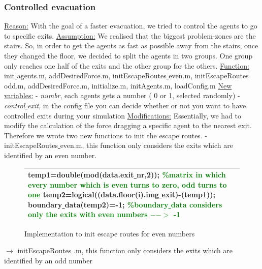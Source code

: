 \documentclass[11pt]{article}
\begin{document}
\subsubsection{Controlled evacuation}

\underline{Reason:}
\newline
With the goal of a faster evacuation, we tried to control the agents to go to specific exits. 
\newline
\underline{Assumption:}
\newline
We realised that the biggest problem-zones are the stairs. So, in order to get the agents as fast as possible away from the stairs, once they changed the floor, we decided to split the agents in two groups. 
One group only reaches one half of the exits and the other group for the others. 
\newline
\underline{Function:}
\newline
init\underline{ }agents.m, addDesiredForce.m, initEscapeRoutes\underline{ }even.m, initEscapeRoutes\underline{ }odd.m, addDesiredForce.m, initialize.m, initAgents.m, loadConfig.m
\newline
\underline{New variables:}
\newline 
- \textit{numbr}, each agents gets a number ( 0 or 1, selected randomly)
\newline
- \textit{control\underline{ }exit}, in the config file you can decide whether or not you want to have controlled exits during your simulation
\newline
\underline{Modifications:}
\newline
Essentially, we had to modify the calculation of the force dragging a specific agent to the nearest exit.  Therefore we wrote two new functions to init the escape routes. 
\newline
- initEscapeRoutes\underline{ }even.m, this function only considers the exits  which are identified by an even number.

\begin{figure}[H]
\centering
\begin{tabular}
{|>{\large}m{\textwidth}|} \hline
\bigskip
temp1=double(mod(data.exit\underline{ }nr,2)); \textcolor{green}{\%matrix in which every number which is even turns to zero, odd turns to one}
\newline
temp2=logical((data.floor(i).img\underline{ }exit)-(temp1));
\newline
boundary\underline{ }data(temp2)=-1; \textcolor{green}{\%boundary\underline{ }data considers only the exits with even numbers $-->$ -1 }
\bigskip
\\ \hline
\end{tabular}
\caption{Implementation to init escape routes for even numbers}
\end{figure}
$\rightarrow$ initEscapeRoutes\underline{ }.m, this function only considers the exits which are identified by an odd number
\end{document}
